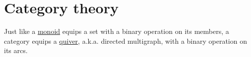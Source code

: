 \section{Category theory}\label{sec:category_theory}

Just like a \hyperref[def:monoid]{monoid} equips a set with a binary operation on its members, a category equips a \hyperref[def:quiver]{quiver}, a.k.a. directed multigraph, with a binary operation on its arcs.

